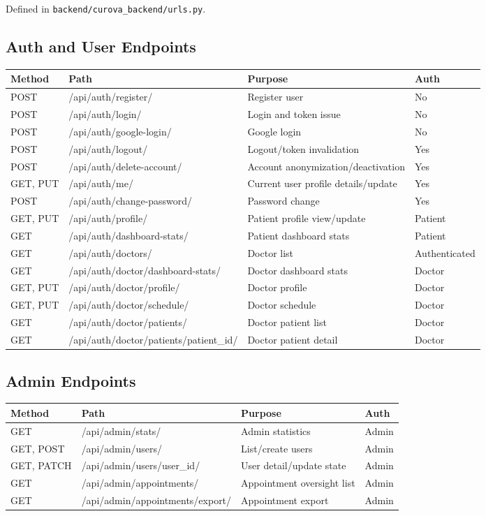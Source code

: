 \documentclass[12pt,a4paper]{article}
\begin{document}
Defined in \texttt{backend/curova\_backend/urls.py}.

\subsection{Auth and User Endpoints}

\begin{longtable}{p{2cm} p{4.4cm} p{4.8cm} p{2.4cm}}
\toprule
\textbf{Method} & \textbf{Path} & \textbf{Purpose} & \textbf{Auth} \\
\midrule
POST & /api/auth/register/ & Register user & No \\
POST & /api/auth/login/ & Login and token issue & No \\
POST & /api/auth/google-login/ & Google login & No \\
POST & /api/auth/logout/ & Logout/token invalidation & Yes \\
POST & /api/auth/delete-account/ & Account anonymization/deactivation & Yes \\
GET, PUT & /api/auth/me/ & Current user profile details/update & Yes \\
POST & /api/auth/change-password/ & Password change & Yes \\
GET, PUT & /api/auth/profile/ & Patient profile view/update & Patient \\
GET & /api/auth/dashboard-stats/ & Patient dashboard stats & Patient \\
GET & /api/auth/doctors/ & Doctor list & Authenticated \\
GET & /api/auth/doctor/dashboard-stats/ & Doctor dashboard stats & Doctor \\
GET, PUT & /api/auth/doctor/profile/ & Doctor profile & Doctor \\
GET, PUT & /api/auth/doctor/schedule/ & Doctor schedule & Doctor \\
GET & /api/auth/doctor/patients/ & Doctor patient list & Doctor \\
GET & /api/auth/doctor/patients/{patient\_id}/ & Doctor patient detail & Doctor \\
\bottomrule
\end{longtable}

\subsection{Admin Endpoints}

\begin{longtable}{p{2cm} p{4.4cm} p{4.8cm} p{2.4cm}}
\toprule
\textbf{Method} & \textbf{Path} & \textbf{Purpose} & \textbf{Auth} \\
\midrule
GET & /api/admin/stats/ & Admin statistics & Admin \\
GET, POST & /api/admin/users/ & List/create users & Admin \\
GET, PATCH & /api/admin/users/{user\_id}/ & User detail/update state & Admin \\
GET & /api/admin/appointments/ & Appointment oversight list & Admin \\
GET & /api/admin/appointments/export/ & Appointment export & Admin \\
\bottomrule
\end{longtable}
\end{document}
